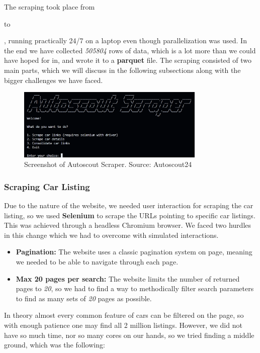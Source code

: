 \documentclass[12pt]{article}
\begin{document}
The scraping took place from \date{2025-04-03} to \date{2025-04-08}, running practically 24/7 on a laptop even though parallelization was used. In the end we have collected \textit{505804} rows of data, which is a lot more than we could have hoped for in, and wrote it to a \textbf{parquet} file. The scraping consisted of two main parts, which we will discuss in the following subsections along with the bigger challenges we have faced.

\begin{figure}[ht]
  \centering
  \includegraphics[width=0.8\textwidth]{./images/autoscout_scraper.png}
  \caption{Screenshot of Autoscout Scraper. Source: Autoscout24}
  \label{fig:autoscout_scraper}
\end{figure}

\subsubsection{Scraping Car Listing}

Due to the nature of the website, we needed user interaction for scraping the car listing, so we used \textbf{Selenium} to scrape the URLs pointing to specific car listings. This was achieved through a headless Chromium browser.
We faced two hurdles in this change which we had to overcome with simulated interactions.

\begin{itemize}
  \item \textbf{Pagination:} The website uses a classic pagination system on page, meaning we needed to be able to navigate through each page.
  \item \textbf{Max 20 pages per search:} The website limits the number of returned pages to \textit{20}, so we had to find a way to methodically filter search parameters to find as many sets of \textit{20} pages as possible.
\end{itemize}

In theory almost every common feature of cars can be filtered on the page, so with enough patience one may find all 2 million listings. However, we did not have so much time, nor so many cores on our hands, so we tried finding a middle ground, which was the following:
\end{document}

